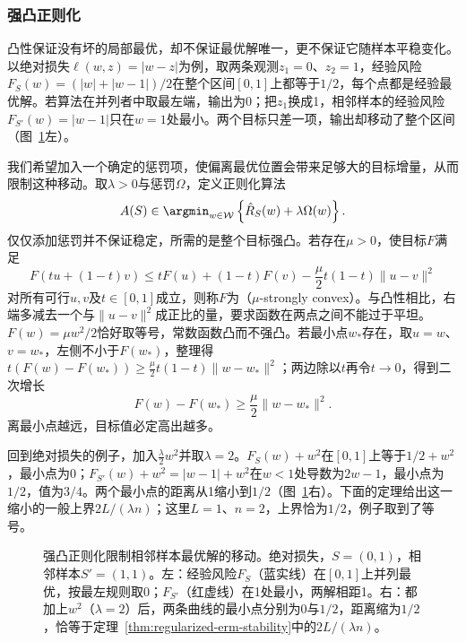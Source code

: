 \subsubsection{强凸正则化}

凸性保证没有坏的局部最优，却不保证最优解唯一，更不保证它随样本平稳变化。以绝对损失$\ell(w,z)=|w-z|$为例，取两条观测$z_1=0$、$z_2=1$，经验风险$F_S(w)=(|w|+|w-1|)/2$在整个区间$[0,1]$上都等于$1/2$，每个点都是经验最优解。若算法在并列者中取最左端，输出为0；把$z_1$换成1，相邻样本的经验风险$F_{S'}(w)=|w-1|$只在$w=1$处最小。两个目标只差一项，输出却移动了整个区间（图~\ref{fig:regularized-minimizer-shift}左）。

我们希望加入一个确定的惩罚项，使偏离最优位置会带来足够大的目标增量，从而限制这种移动。取$\lambda>0$与惩罚$\Omega$，定义正则化算法
\begin{equation}
 A(S)\in\argmin_{w\in\mathcal W}
 \left\{\hat R_S(w)+\lambda\Omega(w)\right\}.
 \label{eq:regularized-erm}
\end{equation}
仅仅添加惩罚并不保证稳定，所需的是整个目标强凸。若存在$\mu>0$，使目标$F$满足
\begin{equation}
 F(tu+(1-t)v)\leq tF(u)+(1-t)F(v)
 -\frac\mu2t(1-t)\|u-v\|^2
 \label{eq:strong-convexity}
\end{equation}
对所有可行$u,v$及$t\in[0,1]$成立，则称$F$为（$\mu$-strongly convex）。与凸性相比，右端多减去一个与$\|u-v\|^2$成正比的量，要求函数在两点之间不能过于平坦。$F(w)=\mu w^2/2$恰好取等号，常数函数凸而不强凸。若最小点$w_*$存在，取$u=w$、$v=w_*$，左侧不小于$F(w_*)$，整理得$t(F(w)-F(w_*))\geq\frac\mu2t(1-t)\|w-w_*\|^2$；两边除以$t$再令$t\to0$，得到二次增长
\begin{equation}
 F(w)-F(w_*)\geq\frac\mu2\|w-w_*\|^2.
 \label{eq:quadratic-growth}
\end{equation}
离最小点越远，目标值必定高出越多。

回到绝对损失的例子，加入$\frac\lambda2w^2$并取$\lambda=2$。$F_S(w)+w^2$在$[0,1]$上等于$1/2+w^2$，最小点为0；$F_{S'}(w)+w^2=|w-1|+w^2$在$w<1$处导数为$2w-1$，最小点为$1/2$，值为$3/4$。两个最小点的距离从1缩小到$1/2$（图~\ref{fig:regularized-minimizer-shift}右）。下面的定理给出这一缩小的一般上界$2L/(\lambda n)$；这里$L=1$、$n=2$，上界恰为$1/2$，例子取到了等号。

\begin{figure}[htbp]
  \centering
  
  \caption{强凸正则化限制相邻样本最优解的移动。绝对损失，$S=(0,1)$，相邻样本$S'=(1,1)$。左：经验风险$F_S$（蓝实线）在$[0,1]$上并列最优，按最左规则取0；$F_{S'}$（红虚线）在1处最小，两解相距1。右：都加上$w^2$（$\lambda=2$）后，两条曲线的最小点分别为0与$1/2$，距离缩为$1/2$，恰等于定理~\ref{thm:regularized-erm-stability}中的$2L/(\lambda n)$。}
  \label{fig:regularized-minimizer-shift}
\end{figure}

